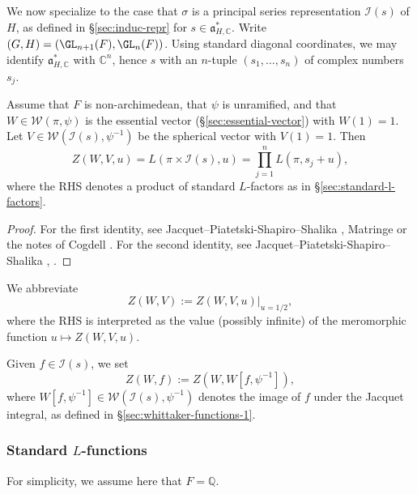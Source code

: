 We now specialize to the case that $\sigma$ is a principal series representation $\mathcal{I}(s)$ of $H$, as defined in \S\ref{sec:induc-repr} for $s \in \mathfrak{a}_{H,\mathbb{C}}^*$.  Write $(G,H) = (\GL_{n+1}(F), \GL_n(F))$.  Using standard diagonal coordinates, we may identify $\mathfrak{a}_{H,\mathbb{C}}^*$ with $\mathbb{C}^n$, hence $s$ with an $n$-tuple $(s_1,\dotsc,s_n)$ of complex numbers $s_j$.
\begin{theorem}\label{thm:jpss-essential-vector-factorized}
  Assume that $F$ is non-archimedean, that $\psi$ is unramified, and that $W \in \mathcal{W}(\pi,\psi)$ is the essential vector (\S\ref{sec:essential-vector}) with $W(1) = 1$.  Let $V \in \mathcal{W}(\mathcal{I}(s), \psi^{-1})$ be the spherical vector with $V(1) = 1$.  Then
  \begin{equation*}
    Z(W,V, u) = L(\pi \times \mathcal{I}(s), u) = \prod_{j=1}^{n} L(\pi, s_j + u),
  \end{equation*}
  where the RHS denotes a product of standard $L$-factors as in \S\ref{sec:standard-l-factors}.
\end{theorem}
\begin{proof}
  For the first identity, see Jacquet--Piatetski-Shapiro--Shalika \cite[p208]{MR620708}, Matringe \cite[Cor 3.3]{MR3138844} or the notes of Cogdell \cite[Thm 3.3]{MR2508768}.  For the second identity, see Jacquet--Piatetski-Shapiro--Shalika \cite[\S9.4, \S8.4, \S5.1]{MR701565}, \cite[Thm 4.3]{MR519356}.
\end{proof}


We abbreviate
\begin{equation*}
  Z(W,V) := Z(W,V,u)|_{u=1/2},
\end{equation*}
where the RHS is interpreted as the value (possibly infinite) of the meromorphic function $u \mapsto Z(W,V,u)$.  

Given $f \in \mathcal{I}(s)$, we set
\begin{equation*}
  Z(W,f) := Z(W, W[f,\psi^{-1}]),
\end{equation*}
where $W[f,\psi^{-1}] \in \mathcal{W}(\mathcal{I}(s), \psi^{-1})$ denotes the image of $f$ under the Jacquet integral, as defined in \S\ref{sec:whittaker-functions-1}.  



\subsubsection{Standard $L$-functions}\label{sec:standard-l-functions}
For simplicity, we assume here that $F = \mathbb{Q}$.


